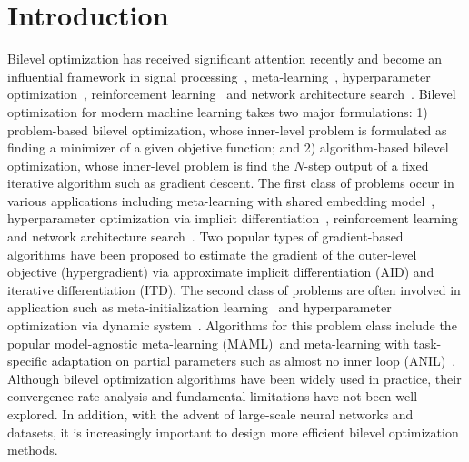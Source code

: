 \documentclass{osudissert96}
\begin{document}
\tableofcontents
\listoftables
\listoffigures


%
%

\chapter{Introduction}\label{intro.ch}
Bilevel optimization has  received significant attention recently and become an influential framework in signal processing~\cite{kunapuli2008classification,flamary2014learning}, meta-learning~\cite{franceschi2018bilevel,bertinetto2018meta,rajeswaran2019meta,ji2020convergence}, hyperparameter optimization~\cite{franceschi2018bilevel,shaban2019truncated,feurer2019hyperparameter}, reinforcement learning~\cite{konda2000actor,hong2020two} and network architecture search~\cite{liu2018darts,he2020milenas}. Bilevel optimization for modern machine learning takes two major formulations: 1) problem-based bilevel optimization, whose inner-level problem is formulated as finding a minimizer of a given objetive function; and 2) algorithm-based bilevel optimization, whose inner-level problem is find the $N$-step output of a fixed iterative algorithm such as gradient descent. 
 The first class of problems occur in various applications including meta-learning with shared embedding model~\cite{bertinetto2018meta}, hyperparameter optimization via implicit differentiation~\cite{domke2012generic,pedregosa2016hyperparameter}, reinforcement learning~\cite{hong2020two} and network architecture search~\cite{he2020milenas}. 
Two popular types of gradient-based algorithms have been proposed to estimate the gradient of the outer-level objective (hypergradient) via approximate implicit differentiation (AID) and iterative differentiation (ITD). The second class of problems are often involved in application such as meta-initialization learning~\cite{finn2017model,grant2018recasting,mi2019meta,collins2020distribution} and hyperparameter optimization via dynamic system~\cite{franceschi2018bilevel}. 
Algorithms for this problem class include the popular model-agnostic meta-learning (MAML)~\cite{finn2017model}and meta-learning with task-specific adaptation on partial parameters such as almost no inner loop (ANIL)~\cite{raghu2020rapid}. Although bilevel optimization algorithms have been widely used in practice, their convergence rate analysis and fundamental limitations have not been well explored.
In addition, with the advent of large-scale neural networks and datasets, it is increasingly important to design more efficient bilevel optimization methods. 
\end{document}
